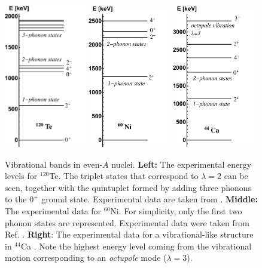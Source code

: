 \begin{figure}
    \centering
    \includegraphics[width=0.32\textwidth]{Chapters/Figures/120Te_vib_experimental.pdf}
    \includegraphics[width=0.32\textwidth]{Chapters/Figures/60Ni_vib_experimental.pdf}
    \includegraphics[width=0.32\textwidth]{Chapters/Figures/44Ca_vib_experimental.pdf}
    \caption{Vibrational bands in even-$A$ nuclei. \textbf{Left:} The experimental energy levels for $^{120}$Te. The triplet states that correspond to $\lambda=2$ can be seen, together with the quintuplet formed by adding three phonons to the $0^+$ ground state. Experimental data are taken from \cite{kitao2002nuclear}. \textbf{Middle:} The experimental data for $^{60}$Ni. For simplicity, only the first two phonon states are represented. Experimental data were taken from Ref. \cite{browne2013nuclear}. \textbf{Right}: The experimental data for a vibrational-like structure in $^{44}$Ca \cite{chen2011nuclear}. Note the highest energy level coming from the vibrational motion corresponding to an \emph{octupole} mode ($\lambda=3$).}
    \label{energy-levels-120Te-virbational-band}    
\end{figure}

